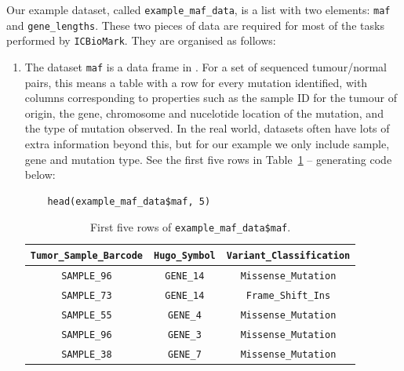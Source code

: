 \documentclass[../thesis.tex]{subfiles}
\begin{document}
Our example dataset, called \lstinline{example_maf_data}, is a list with two elements: \lstinline{maf} and \lstinline{gene_lengths}. These two pieces of data are required for most of the tasks performed by \texttt{ICBioMark}. They are organised as follows:
\begin{enumerate}
    \item The dataset \lstinline{maf} is a data frame in . For a set of sequenced tumour/normal pairs, this means a table with a row for every mutation identified, with columns corresponding to properties such as the sample ID for the tumour of origin, the gene, chromosome and nucelotide location of the mutation, and the type of mutation observed. In the real world,  datasets often have lots of extra information beyond this, but for our example we only include sample, gene and mutation type. See the first five rows in Table~\ref{tab:example_maf} -- generating code below: 
\begin{lstlisting}
    head(example_maf_data$maf, 5)
\end{lstlisting}
\begin{table}[hb]
    \centering
    \begin{tabular}{c|c|c}
         \verb|Tumor_Sample_Barcode| & \verb|Hugo_Symbol| & \verb|Variant_Classification| \\
         \hline
\verb|SAMPLE_96| &	\verb|GENE_14|	& \verb|Missense_Mutation| \\
\verb|SAMPLE_73| &	\verb|GENE_14| & \verb|Frame_Shift_Ins| \\
\verb|SAMPLE_55| &	\verb|GENE_4| & \verb|Missense_Mutation| \\
\verb|SAMPLE_96| &	\verb|GENE_3| & \verb|Missense_Mutation| \\
\verb|SAMPLE_38| &	\verb|GENE_7| & \verb|Missense_Mutation| \\
    \end{tabular}
    \caption{First five rows of \lstinline{example_maf_data$maf}.}
    \label{tab:example_maf}
\end{table}


\end{enumerate}
\end{document}
